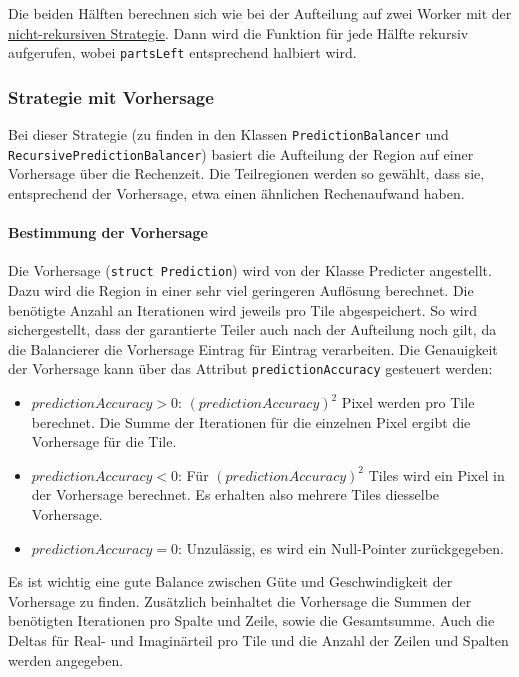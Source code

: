 Die beiden Hälften berechnen sich wie bei der Aufteilung auf zwei Worker mit der \hyperref[lastbalancierung_naiv]{nicht-rekursiven Strategie}.
Dann wird die Funktion für jede Hälfte rekursiv aufgerufen, wobei \verb|partsLeft| entsprechend halbiert wird.

\subsubsection{Strategie mit Vorhersage}

Bei dieser Strategie (zu finden in den Klassen \verb|PredictionBalancer| und \\ \verb|RecursivePredictionBalancer|) basiert die Aufteilung der Region auf einer Vorhersage über die Rechenzeit.
Die Teilregionen werden so gewählt, dass sie, entsprechend der Vorhersage, etwa einen ähnlichen Rechenaufwand haben.

\paragraph*{Bestimmung der Vorhersage}
Die Vorhersage (\verb|struct Prediction|) wird von der Klasse Predicter angestellt.
Dazu wird die Region in einer sehr viel geringeren Auflösung berechnet.
Die benötigte Anzahl an Iterationen wird jeweils pro Tile abgespeichert.
So wird sichergestellt, dass der garantierte Teiler auch nach der Aufteilung noch gilt, da die Balancierer die Vorhersage Eintrag für Eintrag verarbeiten.
Die Genauigkeit der Vorhersage kann über das Attribut \verb|predictionAccuracy| gesteuert werden:
\begin{itemize}
	\item $predictionAccuracy > 0$: $(predictionAccuracy)^2$ Pixel werden pro Tile berechnet. Die Summe der Iterationen für die einzelnen Pixel ergibt die Vorhersage für die Tile.
	\item $predictionAccuracy < 0$: Für $(predictionAccuracy)^2$ Tiles wird ein Pixel in der Vorhersage berechnet. Es erhalten also mehrere Tiles diesselbe Vorhersage.
	\item $predictionAccuracy = 0$: Unzulässig, es wird ein Null-Pointer zurückgegeben.
\end{itemize}
Es ist wichtig eine gute Balance zwischen Güte und Geschwindigkeit der Vorhersage zu finden.
Zusätzlich beinhaltet die Vorhersage die Summen der benötigten Iterationen pro Spalte und Zeile, sowie die Gesamtsumme.
Auch die Deltas für Real- und Imaginärteil pro Tile und die Anzahl der Zeilen und Spalten werden angegeben.

